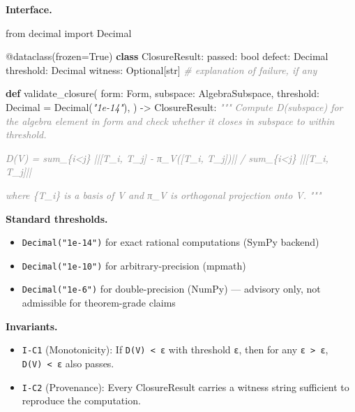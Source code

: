\documentclass[11pt,a4paper]{article}
\newenvironment{Shaded}{\begin{snugshade}\small}{\end{snugshade}}
\newcommand{\ImportTok}[1]{#1}
\newcommand{\KeywordTok}[1]{\textbf{#1}}
\newcommand{\StringTok}[1]{\textit{#1}}
\newcommand{\CommentTok}[1]{\textit{\textcolor{gray}{#1}}}
\newcommand{\VariableTok}[1]{#1}
\newcommand{\OperatorTok}[1]{#1}
\newcommand{\BuiltInTok}[1]{#1}
\newcommand{\AttributeTok}[1]{#1}
\newcommand{\NormalTok}[1]{#1}
\providecommand{\tightlist}{\setlength{\itemsep}{0pt}\setlength{\parskip}{0pt}}
\begin{document}
\textbf{Interface.}

\begin{Shaded}
\begin{Highlighting}[]
\ImportTok{from}\NormalTok{ decimal }\ImportTok{import}\NormalTok{ Decimal}

\AttributeTok{@dataclass}\NormalTok{(frozen}\OperatorTok{=}\VariableTok{True}\NormalTok{)}
\KeywordTok{class}\NormalTok{ ClosureResult:}
\NormalTok{    passed: }\BuiltInTok{bool}
\NormalTok{    defect: Decimal}
\NormalTok{    threshold: Decimal}
\NormalTok{    witness: Optional[}\BuiltInTok{str}\NormalTok{]  }\CommentTok{\# explanation of failure, if any}

\KeywordTok{def}\NormalTok{ validate\_closure(}
\NormalTok{    form: Form,}
\NormalTok{    subspace: AlgebraSubspace,}
\NormalTok{    threshold: Decimal }\OperatorTok{=}\NormalTok{ Decimal(}\StringTok{"1e{-}14"}\NormalTok{),}
\NormalTok{) }\OperatorTok{{-}\textgreater{}}\NormalTok{ ClosureResult:}
    \CommentTok{"""}
\CommentTok{    Compute D(subspace) for the algebra element in \textasciigrave{}form\textasciigrave{} and check}
\CommentTok{    whether it closes in \textasciigrave{}subspace\textasciigrave{} to within \textasciigrave{}threshold\textasciigrave{}.}

\CommentTok{    D(V) = sum\_\{i\textless{}j\} ||[T\_i, T\_j] {-} π\_V([T\_i, T\_j])||}
\CommentTok{         / sum\_\{i\textless{}j\} ||[T\_i, T\_j]||}

\CommentTok{    where \{T\_i\} is a basis of V and π\_V is orthogonal projection onto V.}
\CommentTok{    """}
\end{Highlighting}
\end{Shaded}

\textbf{Standard thresholds.}

\begin{itemize}
\tightlist
\item
  \texttt{Decimal("1e-14")} for exact rational computations (SymPy
  backend)
\item
  \texttt{Decimal("1e-10")} for arbitrary-precision (mpmath)
\item
  \texttt{Decimal("1e-6")} for double-precision (NumPy) --- advisory
  only, not admissible for theorem-grade claims
\end{itemize}

\textbf{Invariants.}

\begin{itemize}
\tightlist
\item
  \texttt{I-C1} (Monotonicity): If \texttt{D(V)\ \textless{}\ ε} with
  threshold \texttt{ε}, then for any
  \texttt{ε\textquotesingle{}\ \textgreater{}\ ε},
  \texttt{D(V)\ \textless{}\ ε\textquotesingle{}} also passes.
\item
  \texttt{I-C2} (Provenance): Every ClosureResult carries a witness
  string sufficient to reproduce the computation.
\end{itemize}
\end{document}
